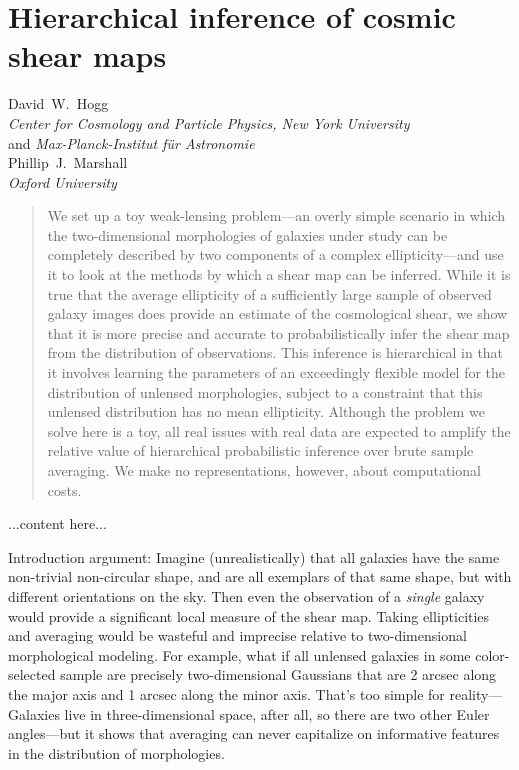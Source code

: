 \documentclass[12pt]{article}
\begin{document}
\section*{Hierarchical inference of cosmic shear maps}
\noindent
David~W.~Hogg \\
\textsl{Center for Cosmology and Particle Physics, New York University} \\
and \textsl{Max-Planck-Institut f\"ur Astronomie} \\[1ex]
Phillip~J.~Marshall \\
\textsl{Oxford University}

\begin{abstract}
We set up a toy weak-lensing problem---an overly simple scenario in
which the two-dimensional morphologies of galaxies under study
can be completely described by two components of a complex ellipticity---and 
use it to look at the
methods by which a shear map can be inferred.  While it is true that
the average ellipticity of a sufficiently large sample of observed
galaxy images does provide an estimate of the cosmological shear, we
show that it is more precise and accurate to probabilistically
infer the shear map from the distribution of observations.  This
inference is hierarchical in that it involves learning the parameters
of an exceedingly flexible model for the distribution of unlensed
morphologies, subject to a constraint that this unlensed distribution
has no mean ellipticity.  Although the problem we solve here is a toy,
all real issues with real data are expected to amplify the relative
value of hierarchical probabilistic inference over brute sample
averaging.  We make no representations, however, about computational
costs.
\end{abstract}

...content here...

Introduction argument: Imagine (unrealistically) that all galaxies
have the same non-trivial non-circular shape, and are all exemplars of
that same shape, but with different orientations on the sky.  Then
even the observation of a \emph{single} galaxy would provide a
significant local measure of the shear map.  Taking ellipticities and
averaging would be wasteful and imprecise relative to two-dimensional
morphological modeling.  For example, what if all unlensed galaxies in
some color-selected sample are precisely two-dimensional Gaussians
that are 2 arcsec along the major axis and 1 arcsec along the minor
axis.  That's too simple for reality---Galaxies live in
three-dimensional space, after all, so there are two other Euler
angles---but it shows that averaging can never capitalize on
informative features in the distribution of morphologies.
\end{document}
